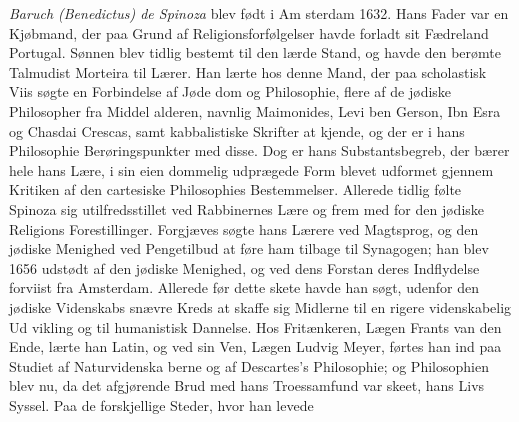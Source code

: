 \documentclass[12pt,a4paper]{book}
\begin{document}
\emph{Baruch (Benedictus) de Spinoza} blev født i Am\-%
sterdam 1632. Hans Fader var en Kjøbmand, der paa Grund
af Religionsforfølgelser havde forladt sit Fædreland Portugal.
Sønnen blev tidlig bestemt til den lærde Stand, og havde den
berømte Talmudist Morteira til Lærer. Han lærte hos denne
Mand, der paa scholastisk Viis søgte en Forbindelse af Jøde\-%
dom og Philosophie, flere af de jødiske Philosopher fra Middel\-%
alderen, navnlig Maimonides, Levi ben Gerson, Ibn Esra og
Chasdai Crescas, samt kabbalistiske Skrifter at kjende, og der
er i hans Philosophie Berøringspunkter med disse. Dog er
hans Substantsbegreb, der bærer hele hans Lære, i sin eien\-%
dommelig udprægede Form blevet udformet gjennem Kritiken
af den cartesiske Philosophies Bestemmelser. Allerede tidlig
følte Spinoza sig utilfredsstillet ved Rabbinernes Lære og frem\-%
med for den jødiske Religions Forestillinger. Forgjæves søgte
hans Lærere ved Magtsprog, og den jødiske Menighed ved
Pengetilbud at føre ham tilbage til Synagogen; han blev
1656 udstødt af den jødiske Menighed, og ved dens Forstan\-%
deres Indflydelse forviist fra Amsterdam. Allerede før dette
skete havde han søgt, udenfor den jødiske Videnskabs snævre
Kreds at skaffe sig Midlerne til en rigere videnskabelig Ud\-%
vikling og til humanistisk Dannelse. Hos Fritænkeren, Lægen
Frants van den Ende, lærte han Latin, og ved sin Ven, Lægen
Ludvig Meyer, førtes han ind paa Studiet af Naturvidenska\-%
berne og af Descartes's Philosophie; og Philosophien blev nu,
da det afgjørende Brud med hans Troessamfund var skeet,
hans Livs Syssel. Paa de forskjellige Steder, hvor han levede
\end{document}
